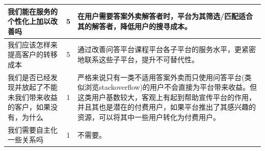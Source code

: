 \documentclass[a4paper]{ctexart}
\begin{document}
\begin{table}[h]
  \centering
\begin{tabular}{|p{3.5cm}|c|p{10cm}|}
\hline
我们能在服务的个性化上加以改善吗 & 5 & 在用户需要答案外卖解答者时，平台为其筛选/匹配适合其的解答者，降低用户的搜寻成本。\\
\hline
我们应该怎样来提高客户的转移成本 & 5 & 通过改善问答平台课程平台各子平台的服务水平，更紧密地联系这些子平台，提升不可替代性。\\
\hline
我们是否已经发现并放起了不能未我们带来收益的客户，如果没有，为什么 & 1 & 严格来说只有一类不适用答案外卖而只使用问答平台(类似浏览stackoverflow)的用户不会直接为平台带来收益。但这类用户基数较大，客观上有起到帮助宣传平台的作用，并且其也是潜在的付费用户，如果平台推出了其感兴趣的资源，可以将其中一些用户转化为付费用户。\\
\hline
我们需要自主化一些关系吗 & 1 & 不需要。\\
\hline
\end{tabular}
\end{table}







\end{document}
